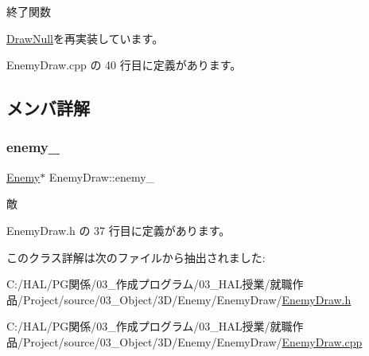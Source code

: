 終了関数 



\mbox{\hyperlink{class_draw_null_a12d44e341c7364b5ab9cdd661dc16187}{Draw\+Null}}を再実装しています。



 Enemy\+Draw.\+cpp の 40 行目に定義があります。



\subsection{メンバ詳解}
\mbox{\label{class_enemy_draw_a95b8a7f07e810d1347f1704669c8f790}} 
\subsubsection{\texorpdfstring{enemy\+\_\+}{enemy\_}}
{\footnotesize\ttfamily \mbox{\hyperlink{class_enemy}{Enemy}}$\ast$ Enemy\+Draw\+::enemy\+\_\+\hspace{0.3cm}{\ttfamily [private]}}



敵 



 Enemy\+Draw.\+h の 37 行目に定義があります。



このクラス詳解は次のファイルから抽出されました\+:\begin{DoxyCompactItemize}
\item 
C\+:/\+H\+A\+L/\+P\+G関係/03\+\_\+作成プログラム/03\+\_\+\+H\+A\+L授業/就職作品/\+Project/source/03\+\_\+\+Object/3\+D/\+Enemy/\+Enemy\+Draw/\mbox{\hyperlink{_enemy_draw_8h}{Enemy\+Draw.\+h}}\item 
C\+:/\+H\+A\+L/\+P\+G関係/03\+\_\+作成プログラム/03\+\_\+\+H\+A\+L授業/就職作品/\+Project/source/03\+\_\+\+Object/3\+D/\+Enemy/\+Enemy\+Draw/\mbox{\hyperlink{_enemy_draw_8cpp}{Enemy\+Draw.\+cpp}}\end{DoxyCompactItemize}
